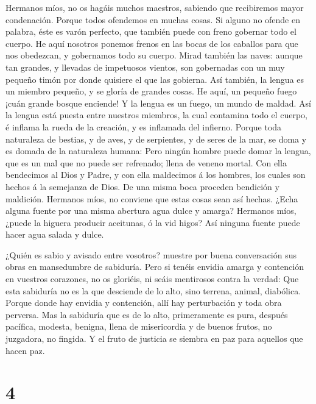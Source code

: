  Hermanos míos, no os hagáis muchos maestros, sabiendo que
recibiremos mayor condenación.  Porque todos ofendemos en
muchas cosas. Si alguno no ofende en palabra, éste es varón perfecto,
que también puede con freno gobernar todo el cuerpo.  He
aquí nosotros ponemos frenos en las bocas de los caballos para que nos
obedezcan, y gobernamos todo su cuerpo.  Mirad también las
naves: aunque tan grandes, y llevadas de impetuosos vientos, son
gobernadas con un muy pequeño timón por donde quisiere el que las
gobierna.  Así también, la lengua es un miembro pequeño, y
se gloría de grandes cosas. He aquí, un pequeño fuego ¡cuán grande
bosque enciende!  Y la lengua es un fuego, un mundo de
maldad. Así la lengua está puesta entre nuestros miembros, la cual
contamina todo el cuerpo, é inflama la rueda de la creación, y es
inflamada del infierno.  Porque toda naturaleza de bestias,
y de aves, y de serpientes, y de seres de la mar, se doma y es domada de
la naturaleza humana:  Pero ningún hombre puede domar la
lengua, que es un mal que no puede ser refrenado; llena de veneno
mortal.  Con ella bendecimos al Dios y Padre, y con ella
maldecimos á los hombres, los cuales son hechos á la semejanza de Dios.
 De una misma boca proceden bendición y maldición. Hermanos
míos, no conviene que estas cosas sean así hechas.  ¿Echa
alguna fuente por una misma abertura agua dulce y amarga? 
Hermanos míos, ¿puede la higuera producir aceitunas, ó la vid higos? Así
ninguna fuente puede hacer agua salada y dulce.

 ¿Quién es sabio y avisado entre vosotros? muestre por
buena conversación sus obras en mansedumbre de sabiduría. 
Pero si tenéis envidia amarga y contención en vuestros corazones, no os
gloriéis, ni seáis mentirosos contra la verdad:  Que esta
sabiduría no es la que desciende de lo alto, sino terrena, animal,
diabólica.  Porque donde hay envidia y contención, allí hay
perturbación y toda obra perversa.  Mas la sabiduría que es
de lo alto, primeramente es pura, después pacífica, modesta, benigna,
llena de misericordia y de buenos frutos, no juzgadora, no fingida.
 Y el fruto de justicia se siembra en paz para aquellos que
hacen paz.

\hypertarget{section-3}{%
\section{4}\label{section-3}}

